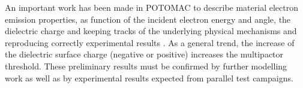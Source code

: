 An important work has been made in POTOMAC to describe material electron emission properties, as function of the incident electron energy and angle, the dielectric charge and keeping tracks of the underlying physical mechanisms and reproducing correctly experimental results . As a general trend, the increase of the dielectric surface charge (negative or positive) increases the multipactor threshold. These preliminary results must be confirmed by further modelling work as well as by experimental results expected from parallel test campaigns.



